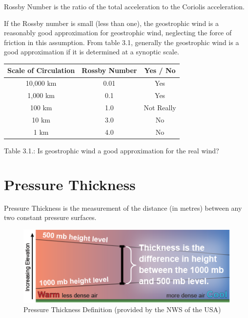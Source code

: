 \begin{definition}
Rossby Number is the ratio of the total acceleration to the Coriolis acceleration.
\end{definition}

If the Rossby number is small (less than one), the geostrophic wind is a reasonably good approximation for geostrophic wind, neglecting the force of friction in this assumption. From table 3.1, generally the geostrophic wind is a good approximation if it is determined at a synoptic scale\cite{geo_wind}. 

\hfill

\begin{center}
\begin{tabular}{|c|c|c|} 
 \hline
 Scale of Circulation & Rossby Number & Yes / No \\
 \hline
 10,000 km & 0.01 & Yes \\
 \hline
 1,000 km & 0.1 & Yes \\
 \hline
 100 km & 1.0 & Not Really \\
 \hline
 10 km & 3.0 & No \\
 \hline
 1 km & 4.0 & No \\
 \hline
\end{tabular}\par
\bigskip
Table 3.1.: Is geostrophic wind a good approximation for the real wind?
\end{center}

\section{Pressure Thickness}\label{pressure_thickness}
\begin{definition}
Pressure Thickness is the measurement of the distance (in metres) between any two constant pressure surfaces.
\end{definition}

\begin{figure}[H]
    \centering
    \includegraphics[width=.8\linewidth]{Images/thickness_def.png}
    \caption{Pressure Thickness Definition (provided by the NWS of the USA)}
    \label{thickness_def}
\end{figure}


